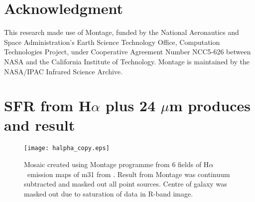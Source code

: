\documentclass[useAMS,usenatbib]{mn2e}
\newcommand \halpha    {H$\alpha $\ }
\begin{document}
\section*{Acknowledgment}
This research made use of Montage, funded by the National Aeronautics and Space Administration's Earth Science Technology Office, Computation Technologies Project, under Cooperative Agreement Number NCC5-626 between NASA and the California Institute of Technology. Montage is maintained by the NASA/IPAC Infrared Science Archive.
\newpage




\appendix
\section{SFR from H$\alpha$ plus 24 $\mu$m produces and result}
\label{app:halpha}
\begin{figure*}
\texttt{[image: halpha\_copy.eps]}
\caption{Mosaic created using Montage programme from 6 fields of \halpha emission maps of m31 from . Result from Montage was continuum subtracted and masked out all point sources. Centre of galaxy was masked out due to saturation of data in R-band image.}
\label{fig:halpha}
\end{figure*}
\end{document}
